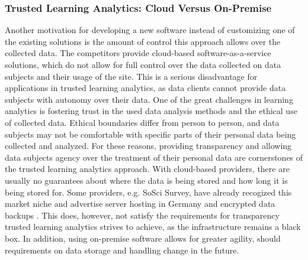     \subsubsection{Trusted Learning Analytics: Cloud Versus On-Premise}
        Another motivation for developing a new software instead of customizing
        one of the existing solutions is the amount of control this approach allows
        over the collected data. The competitors provide cloud-based software-as-a-service
        solutions, which do not allow for full control over the data collected on data subjects
        and their usage of the site. This is a serious disadvantage for applications
        in trusted learning analytics, as data clients cannot provide data subjects
        with autonomy over their data. One of the great challenges in learning analytics
        is fostering trust in the used data analysis methods and the ethical use
        of collected data. Ethical boundaries differ from person to person,
        and data subjects may not be comfortable with specific parts of their
        personal data being collected and analyzed. For these reasons, providing 
        transparency and allowing data subjects agency over the treatment of their personal data are
        cornerstones of the trusted learning analytics approach.
        With cloud-based providers, there are usually no guarantees about where
        the data is being stored and how long it is being stored for.
        Some providers, e.g. SoSci Survey, have already recogized this market niche 
        and advertise server hosting in Germany and encrypted data backups \cite{soscisurvey}.
        This does, however, not satisfy the requirements for transparency trusted
        learning analytics strives to achieve, as the infrastructure remains a
        black box. In addition, using on-premise software allows for greater agility,
        should requirements on data storage and handling change in the future.


